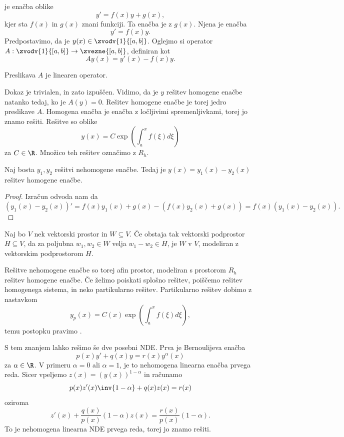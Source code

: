 
 je enačba oblike
\[
  y' = f(x) y + g(x),
\]
kjer sta $f(x)$ in $g(x)$ znani funkciji.
Ta enačba je  z  $g(x)$.
Njena  je enačba
\[
  y' = f(x) y.
\]
Predpostavimo, da je $y(x) \in \zvodv{1}{[a, b]}$.
Oglejmo si operator $A : \zvodv{1}{[a, b]} \to \zvezne{[a, b]}$,
definiran kot
\[
  A y(x) = y'(x) - f(x) y.
\]

\begin{trditev}
  Preslikava $A$ je linearen operator.
\end{trditev}
Dokaz je trivialen, in zato izpuščen.
Vidimo, da je $y$ rešitev homogene enačbe natanko tedaj, ko je $A(y) = 0$.
Rešitev homogene enačbe je torej jedro preslikave $A$.
Homogena enačba je enačba z ločljivimi spremenljivkami, torej jo znamo rešiti.
Rešitve so oblike
\[
  y(x) = C \exp\left( \int_a^x f(\xi) d\xi \right)
\]
za $C \in \R$.
Množico teh rešitev označimo z $R_h$.

\begin{trditev}
  Naj bosta $y_1, y_2$ rešitvi nehomogene enačbe.
  Tedaj je $y(x) = y_1(x) - y_2(x)$ rešitev homogene enačbe.
\end{trditev}

\begin{proof}
  Izračun odvoda nam da
  \[
	(y_1(x) - y_2(x))' = f(x) y_1(x) + g(x) - (f(x) y_2(x) + g(x)) = f(x)
	(y_1(x) - y_2(x)).
  \]
\end{proof}

\begin{definicija}
  Naj bo $V$ nek vektorski prostor in $W \subseteq V$.
  Če obstaja tak vektorski podprostor $H \subseteq V$, da za poljubna $w_1, w_2
  \in W$ velja $w_1 - w_2 \in H$, je $W$  v $V$,
  modeliran z vektorskim podprostorom $H$.
\end{definicija}

Rešitve nehomogene enačbe so torej afin prostor, modeliran s prostorom $R_h$
rešitev homogene enačbe.
Če želimo poiskati splošno rešitev, poiščemo rešitev homogenega sistema, in neko
partikularno rešitev.
Partikularno rešitev dobimo z nastavkom
\[
  y_p(x) = C(x) \exp\left( \int_a^x f(\xi) d\xi \right),
\]
temu postopku pravimo .


S tem znanjem lahko rešimo še dve posebni NDE.
Prva je Bernoulijeva enačba
\[
  p(x) y' + q(x) y = r(x) y^\alpha(x)
\]
za $\alpha \in \R$.
V primeru $\alpha = 0$ ali $\alpha = 1$, je to nehomogena linearna enačba prvega
reda.
Sicer vpeljemo $z(x) = (y(x))^{1-\alpha}$ in računamo
\[
  p(x) z'(x) \inv{1-\alpha} + q(x) z(x) = r(x)
\]
oziroma
\[
  z'(x) + \frac{q(x)}{p(x)} (1-\alpha) z(x) = \frac{r(x)}{p(x)} (1-\alpha).
\]
To je nehomogena linearna NDE prvega reda, torej jo znamo rešiti.

